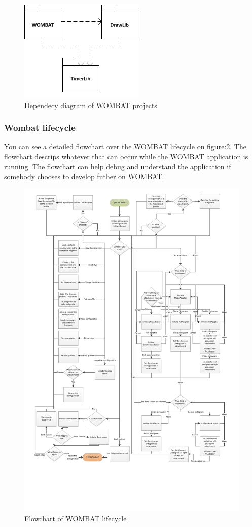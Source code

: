 \begin{figure}[H]
	\centering
		\includegraphics[scale=0.6]{Images/Implementation/LibraryDependency.png}
	\caption{Dependecy diagram of WOMBAT projects}
	\label{fig:LibraryDependency}
\end{figure}

\subsubsection{Wombat lifecycle}
You can see a detailed flowchart over the WOMBAT lifecycle on figure:\ref{fig:wombatLifeCycle}. The flowchart descrips whatever that can occur while the WOMBAT application is running. The flowchart can help debug and understand the application if somebody chooses to develop futher on WOMBAT.

\begin{figure}[H]
	\centering
		\includegraphics[scale=0.6]{Images/Implementation/wombatLifeCycle.pdf}
	\caption{Flowchart of WOMBAT lifecycle}
	\label{fig:wombatLifeCycle}
\end{figure}